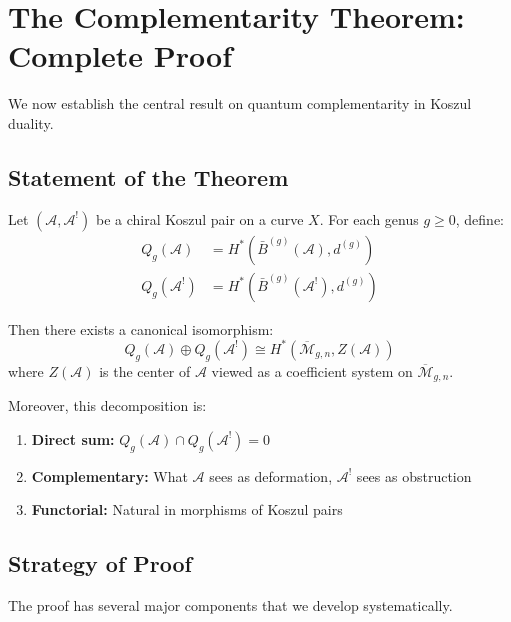 \section{The Complementarity Theorem: Complete Proof}
\label{sec:complementarity-theorem}

We now establish the central result on quantum complementarity in Koszul duality.

\subsection{Statement of the Theorem}

\begin{theorem}
\label{thm:quantum-complementarity-main}
Let $(\mathcal{A}, \mathcal{A}^!)$ be a chiral Koszul pair on a curve $X$. For each genus $g \geq 0$, define:
\begin{align}
Q_g(\mathcal{A}) &= H^*(\bar{B}^{(g)}(\mathcal{A}), d^{(g)})\\
Q_g(\mathcal{A}^!) &= H^*(\bar{B}^{(g)}(\mathcal{A}^!), d^{(g)})
\end{align}

Then there exists a canonical isomorphism:
\begin{equation}
Q_g(\mathcal{A}) \oplus Q_g(\mathcal{A}^!) \cong H^*(\overline{\mathcal{M}}_{g,n}, Z(\mathcal{A}))
\end{equation}
where $Z(\mathcal{A})$ is the center of $\mathcal{A}$ viewed as a coefficient system on $\overline{\mathcal{M}}_{g,n}$.

Moreover, this decomposition is:
\begin{enumerate}
\item \textbf{Direct sum:} $Q_g(\mathcal{A}) \cap Q_g(\mathcal{A}^!) = 0$
\item \textbf{Complementary:} What $\mathcal{A}$ sees as deformation, $\mathcal{A}^!$ sees as obstruction
\item \textbf{Functorial:} Natural in morphisms of Koszul pairs
\end{enumerate}
\end{theorem}

\subsection{Strategy of Proof}

The proof has several major components that we develop systematically.

